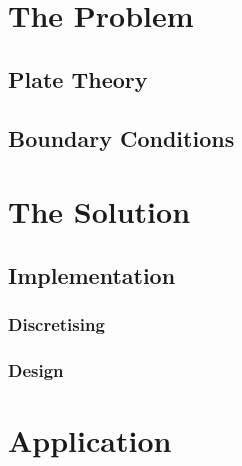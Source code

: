 \section{The Problem}\label{the-problem-2}

\subsection{Plate Theory}\label{plate-theory}

\subsection{Boundary Conditions}\label{boundary-conditions}

\section{The Solution}\label{the-solution-1}

\subsection{Implementation}\label{implementation}

\subsubsection{Discretising}\label{discretising}
\subsubsection{Design}\label{design}

\section{Application}\label{application-1}
